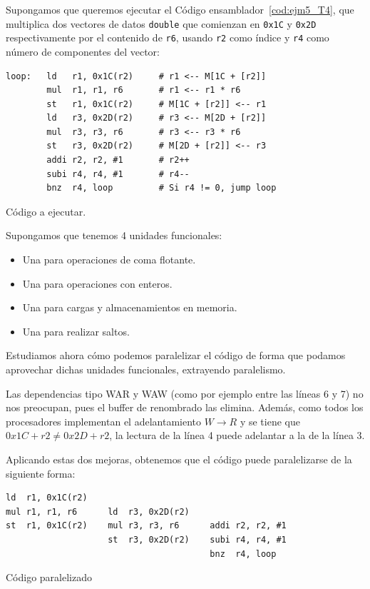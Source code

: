\begin{ejemplo}
    Supongamos que queremos ejecutar el Código ensamblador~\ref{cod:ejm5_T4}, que multiplica dos vectores de datos \verb|double| que comienzan en \verb|0x1C| y \verb|0x2D| respectivamente por el contenido de \verb|r6|, usando \verb|r2| como índice y \verb|r4| como número de componentes del vector:\\
    \begin{listing}[H]
    \begin{verbatim}
loop:   ld   r1, 0x1C(r2)     # r1 <-- M[1C + [r2]]
        mul  r1, r1, r6       # r1 <-- r1 * r6
        st   r1, 0x1C(r2)     # M[1C + [r2]] <-- r1
        ld   r3, 0x2D(r2)     # r3 <-- M[2D + [r2]]
        mul  r3, r3, r6       # r3 <-- r3 * r6
        st   r3, 0x2D(r2)     # M[2D + [r2]] <-- r3
        addi r2, r2, #1       # r2++
        subi r4, r4, #1       # r4--
        bnz  r4, loop         # Si r4 != 0, jump loop
    \end{verbatim}
    \caption{Código a ejecutar.}
    \label{cod:ejm5_T4}
    \end{listing}

    Supongamos que tenemos 4 unidades funcionales: 
    \begin{itemize}
        \item Una para operaciones de coma flotante.
        \item Una para operaciones con enteros.
        \item Una para cargas y almacenamientos en memoria.
        \item Una para realizar saltos.
    \end{itemize}
    Estudiamos ahora cómo podemos paralelizar el código de forma que podamos aprovechar dichas unidades funcionales, extrayendo paralelismo.

    Las dependencias tipo WAR y WAW (como por ejemplo entre las líneas 6 y 7) no nos preocupan, pues el buffer de renombrado las elimina. Además, como todos los procesadores implementan el adelantamiento $W\rightarrow R$ y se tiene que $0x1C + r2 \neq 0x2D + r2$, la lectura de la línea 4 puede adelantar a la de la línea 3. 

    Aplicando estas dos mejoras, obtenemos que el código puede paralelizarse de la siguiente forma:\\
    \begin{listing}[H]
    \begin{verbatim}
ld  r1, 0x1C(r2)
mul r1, r1, r6      ld  r3, 0x2D(r2)
st  r1, 0x1C(r2)    mul r3, r3, r6      addi r2, r2, #1
                    st  r3, 0x2D(r2)    subi r4, r4, #1
                                        bnz  r4, loop
    \end{verbatim}
    \caption{Código paralelizado}
    \label{cod:ejm4_T4_paralelizado}
    \end{listing}


\end{ejemplo}
